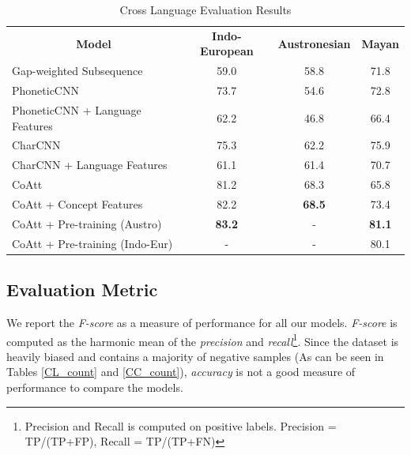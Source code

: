 \documentclass[11pt,letterpaper]{article}
\begin{document}
\begin{table}[t]
\centering
\begin{tabular}{lccc}
\multicolumn{1}{c}{\textbf{Model}} & \textbf{Indo-European} & \textbf{Austronesian} & \textbf{Mayan} \\
Gap-weighted Subsequence           & 59.0                   & 58.8                  & 71.8           \\
PhoneticCNN                        & 73.7                   & 54.6                  & 72.8           \\
PhoneticCNN + Language Features                 & 62.2                   & 46.8                  & 66.4           \\
CharCNN                            & 75.3                   & 62.2                  & 75.9           \\
CharCNN + Language Features                     & 61.1                   & 61.4                  & 70.7           \\ \hline
CoAtt                              & 81.2                   & 68.3                  & 65.8          \\
CoAtt + Concept Features                   & 82.2                   & \textbf{68.5}                  & 73.4          \\
CoAtt + Pre-training (Austro)                    & \textbf{83.2}                   & -                  & \textbf{81.1}     \\
CoAtt + Pre-training (Indo-Eur)               & -                   & -                  & 80.1          
\end{tabular}
\label{CL_res}
\caption{Cross Language Evaluation Results}
\end{table}

\subsection{Evaluation Metric}

We report the \textit{F-score} as a measure of performance for all our models. \textit{F-score} is computed as the harmonic mean of the \textit{precision} and \textit{recall}\footnote{Precision and Recall is computed on positive labels. Precision = TP/(TP+FP), Recall = TP/(TP+FN)}. Since the dataset is heavily biased and contains a majority of negative samples (As can be seen in Tables \ref{CL_count} and \ref{CC_count}), \textit{accuracy} is not a good measure of performance to compare the models.
\end{document}
